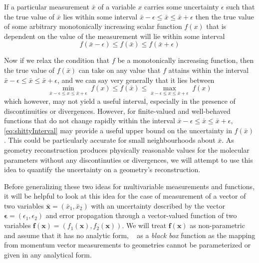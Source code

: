 If a particular measurement $\bar{x}$ of a variable $x$ carries some uncertainty $\epsilon$ such that the true value of $\bar{x}$ lies within some interval $\bar{x} - \epsilon \le \bar{x} \le \bar{x} + \epsilon$ then the true value of some arbitrary monotonically increasing scalar function $f(x)$ that is dependent on the value of the measurement will lie within some interval
\begin{equation}
  f(\bar{x} - \epsilon) \le f(\bar{x}) \le f(\bar{x} + \epsilon)
\end{equation}

Now if we relax the condition that $f$ be a monotonically increasing function, then the true value of $f(\bar{x})$ can take on any value that $f$ attains within the interval $\bar{x} - \epsilon \le \bar{x} \le \bar{x} + \epsilon$, and we can say very generally that it lies between
\begin{equation} \label{eq:shittyInterval}
  \min_{\displaystyle \bar{x} - \epsilon \le x \le \bar{x} + \epsilon} \; f(x)
  \le f(\bar{x})
  \le \max_{\displaystyle \bar{x} - \epsilon \le x \le \bar{x} + \epsilon} \; f(x)
\end{equation}
which however, may not yield a useful interval, especially in the presence of discontinuities or divergences. However, for finite-valued and well-behaved functions that do not change rapidly within the interval $\bar{x} - \epsilon \le \bar{x} \le \bar{x} + \epsilon$, \eqref{eq:shittyInterval} may provide a useful upper bound on the uncertainty in $f(\bar{x})$. This could be particularly accurate for small neighbourhoods about $\bar{x}$. As geometry reconstruction produces physically reasonable values for the molecular parameters without any discontinuties or divergences, we will attempt to use this idea to quantify the uncertainty on a geometry's reconstruction.

Before generalizing these two ideas for multivariable measurements and functions, it will be helpful to look at this idea for the case of measurement of a vector of two variables $\bar{\mathbf{x}} = (\bar{x}_1, \bar{x}_2)$ with an uncertainty described by the vector $\bm{\epsilon} = (\epsilon_1, \epsilon_2)$ and error propagation through a vector-valued function of two variables $\mathbf{f}(\mathbf{x}) = (f_1(\mathbf{x}), f_2(\mathbf{x}))$. We will treat $\mathbf{f}(\mathbf{x})$ as non-parametric and assume that it has no analytic form, \ie~ as a \emph{black box} function as the mapping from momentum vector measurements to geometries cannot be parameterized or given in any analytical form.

